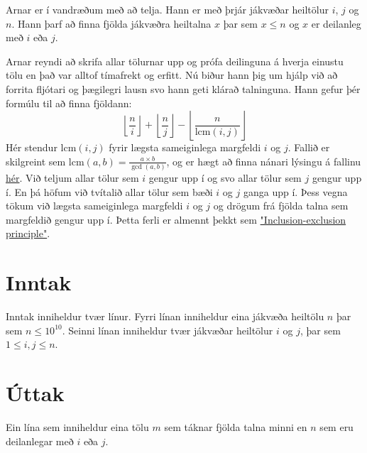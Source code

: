 Arnar er í vandræðum með að telja. Hann er með þrjár jákvæðar heiltölur $i$, $j$ og $n$. Hann þarf að finna  fjölda jákvæðra heiltalna $x$ þar sem $x \leq n$ og $x$ er deilanleg með $i$ eða $j$.

Arnar reyndi að skrifa allar tölurnar upp og prófa deilinguna á hverja einustu tölu en það var alltof tímafrekt og erfitt. Nú biður hann þig um hjálp við að forrita fljótari og þægilegri lausn svo hann geti klárað talninguna. Hann gefur þér formúlu til að finna fjöldann:
$$\left\lfloor\frac{n}{i}\right\rfloor + \left\lfloor\frac{n}{j}\right\rfloor - \left\lfloor\frac{n}{\mathrm{lcm}(i,j)}\right\rfloor$$
Hér stendur $\mathrm{lcm}(i,j)$ fyrir lægsta sameiginlega margfeldi $i$ og $j$. Fallið er skilgreint sem $\mathrm{lcm}(a,b) = \frac{a \times b}{\gcd(a,b)}$, og er hægt að finna nánari lýsingu á fallinu \href{http://en.wikipedia.org/wiki/Least_common_multiple}{hér}. Við teljum allar tölur sem $i$ gengur upp í og svo allar tölur sem $j$ gengur upp í. En þá höfum við tvítalið allar tölur sem bæði $i$ og $j$ ganga upp í. Þess vegna tökum við lægsta sameiginlega margfeldi $i$ og $j$ og drögum frá fjölda talna sem margfeldið gengur upp í. Þetta ferli er almennt þekkt sem \href{http://en.wikipedia.org/wiki/Inclusion-exclusion_principle}{"Inclusion-exclusion principle"}.

\section*{Inntak}
Inntak inniheldur tvær línur. Fyrri línan inniheldur eina jákvæða heiltölu $n$ þar sem $n \leq 10^{10}$.
Seinni línan inniheldur tvær jákvæðar heiltölur $i$ og $j$,
þar sem $1 \leq i,j \leq n$.

\section*{Úttak}
Ein lína sem inniheldur eina tölu $m$ sem táknar fjölda talna minni en $n$ sem eru deilanlegar með $i$ eða $j$.
